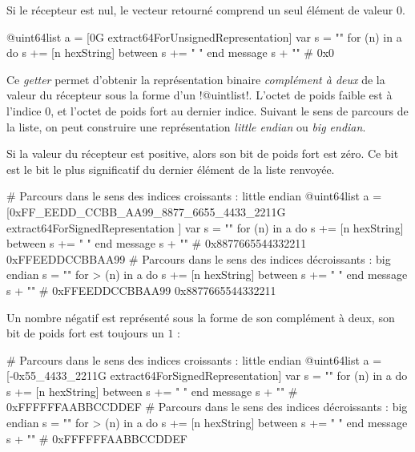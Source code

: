 Si le récepteur est nul, le vecteur retourné comprend un seul élément de valeur $0$.

\begin{galgas}
@uint64list a = [0G extract64ForUnsignedRepresentation]
var s = ""
for (n) in a
  do s += [n hexString]
  between s += " "
end
message s + "\n" # 0x0
\end{galgas}





Ce \emph{getter} permet d'obtenir la représentation binaire \emph{complément à deux} de la valeur du récepteur sous la forme d'un \ggs!@uintlist!. L'octet de poids faible est à l'indice $0$, et l'octet de poids fort au dernier indice. Suivant le sens de parcours de la liste, on peut construire une représentation \emph{little endian} ou \emph{big endian}.

Si la valeur du récepteur est positive, alors son bit de poids fort est zéro. Ce bit est le bit le plus significatif du dernier élément de la liste renvoyée.

\begin{galgas}
# Parcours dans le sens des indices croissants : little endian
@uint64list a = [0xFF_EEDD_CCBB_AA99_8877_6655_4433_2211G
  extract64ForSignedRepresentation
]
var s = ""
for (n) in a
  do s += [n hexString]
  between s += " "
end
message s + "\n" # 0x8877665544332211 0xFFEEDDCCBBAA99
# Parcours dans le sens des indices décroissants : big endian
s = ""
for > (n) in a
  do s += [n hexString]
  between s += " "
end
message s + "\n" # 0xFFEEDDCCBBAA99 0x8877665544332211
\end{galgas}

Un nombre négatif est représenté sous la forme de son complément à deux, son bit de poids fort est toujours un $1$ : 

\begin{galgas}
# Parcours dans le sens des indices croissants : little endian
@uint64list a = [-0x55_4433_2211G extract64ForSignedRepresentation]
var s = ""
for (n) in a
  do s += [n hexString]
  between s += " "
end
message s + "\n" # 0xFFFFFFAABBCCDDEF
# Parcours dans le sens des indices décroissants : big endian
s = ""
for > (n) in a
  do s += [n hexString]
  between s += " "
end
message s + "\n" # 0xFFFFFFAABBCCDDEF
\end{galgas}














